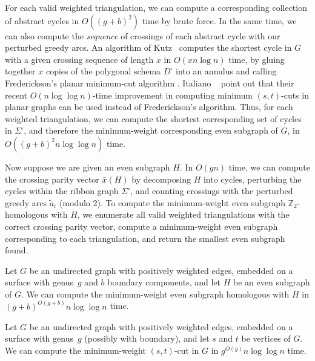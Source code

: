 \documentclass[letterpaper,review]{siamart190516}
\def\Z{\mathbb{Z}}
\def\rnote#1{\color{red}Review: #1 \color{black}}
\begin{document}
For each valid weighted triangulation, we can compute a corresponding collection of abstract cycles in $O((g+b)^2)$ time by brute force.  In the same time, we can also compute the \emph{sequence} of crossings of each abstract cycle with our perturbed greedy arcs.  An algorithm of Kutz~\cite{k-csnco-06} computes the shortest cycle in $G$ with a given crossing sequence of length $x$ in $O(x n \log n)$ time, by gluing together $x$ copies of the polygonal schema $D^\square$ into an annulus and calling Frederickson's planar minimum-cut algorithm \cite{f-faspp-87}.
Italiano \etal~\cite{insw-iamcmf-11} point out that their recent $O(n \log \log n)$-time improvement in computing minimum $(s,t)$-cuts in planar graphs can be used instead of Frederickson's algorithm. 
Thus, for each weighted triangulation, we can compute the shortest corresponding set of cycles in $\Sigma^\square$, and therefore the minimum-weight corresponding even subgraph of $G$, in $O((g+b)^2 n \log \log n)$ time.



Now suppose we are given an even subgraph $H$.  In $O(gn)$ time, we can compute the crossing parity vector $\bar{x}(H)$ by decomposing $H$ into cycles, perturbing the cycles within the ribbon graph $\Sigma^\square$, and counting crossings with the perturbed greedy arcs $\tilde{a}_i$ (modulo 2).  To compute the minimum-weight even subgraph $\Z_2$-homologous with $H$, we enumerate all valid weighted triangulations with the correct crossing parity vector, compute a minimum-weight even subgraph corresponding to each triangulation, and return the smallest even subgraph found. 

\begin{theorem}
\label{Th:Z2-minimal-crossing}
Let $G$ be an undirected graph with positively weighted edges, embedded on a surface with genus~$g$ and $b$ boundary components, and let $H$ be an even subgraph of $G$.  We can compute the minimum-weight even subgraph homologous with $H$ in $(g+b)^{O(g+b)} n\log \log n$ time.
\end{theorem}

\begin{corollary}
\label{C:min-cut-crossing}
Let $G$ be an undirected graph with positively weighted edges, embedded on a surface with genus~$g$ (possibly with boundary), and let $s$ and $t$ be vertices of $G$.  We can compute the minimum-weight $(s,t)$-cut in $G$ in $g^{O(g)} n\log \log n$ time.
\end{corollary}
\end{document}
